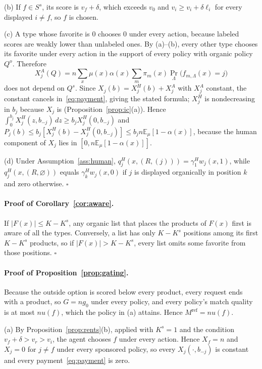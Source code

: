 \documentclass[opre,dblanonrev]{informs4}
\providecommand{\E}{\mathbb{E}}
\providecommand{\1}{\mathbf{1}}
\begin{document}
\begin{APPENDICES}
(b) If $f\in S^s$, its score is $v_f+\delta$, which exceeds $v_0$ and $v_i\ge v_i+\delta\ell_i$ for every displayed $i\ne f$, so $f$ is chosen.

(c) A type whose favorite is $0$ chooses $0$ under every action, because labeled scores are weakly lower than unlabeled ones. By (a)--(b), every other type chooses its favorite under every action in the support of every policy with organic policy $Q^o$. Therefore
\[
X_j^A(Q)=n\sum_x\mu(x)\alpha(x)\sum_m\pi_m(x)\Pr_\Lambda\bigl(f_{m,\Lambda}(x)=j\bigr)
\]
does not depend on $Q^s$. Since $X_j(b)=X_j^H(b)+X_j^A$ with $X_j^A$ constant, the constant cancels in~\eqref{eq:payment}, giving the stated formula; $X_j^H$ is nondecreasing in $b_j$ because $X_j$ is (Proposition~\ref{prop:ic}(a)). Hence $\int_0^{b_j}X_j^H(z,b_{-j})\,dz\ge b_jX_j^H(0,b_{-j})$ and $P_j(b)\le b_j[X_j^H(b)-X_j^H(0,b_{-j})]\le b_jn\E_\mu[1-\alpha(x)]$, because the human component of $X_j$ lies in $[0,n\E_\mu[1-\alpha(x)]]$.

(d) Under Assumption~\ref{ass:human}, $q_j^H(x,(R,(j)))=\gamma_1^Hw_j(x,1)$, while $q_j^H(x,(R,\varnothing))$ equals $\gamma_k^Hw_j(x,0)$ if $j$ is displayed organically in position $k$ and zero otherwise. \hfill$\square$

\paragraph{Proof of Corollary~\ref{cor:aware}.}
If $|F(x)|\le K-K^s$, any organic list that places the products of $F(x)$ first is aware of all the types. Conversely, a list has only $K-K^s$ positions among its first $K-K^s$ products, so if $|F(x)|>K-K^s$, every list omits some favorite from those positions. \hfill$\square$

\paragraph{Proof of Proposition~\ref{prop:gating}.}
Because the outside option is scored below every product, every request ends with a product, so $G=ng_0$ under every policy, and every policy's match quality is at most $nu(f)$, which the policy in (a) attains. Hence $M^{\mathrm{ref}}=nu(f)$.

(a) By Proposition~\ref{prop:rents}(b), applied with $K^s=1$ and the condition $v_f+\delta>v_r>v_i$, the agent chooses $f$ under every action. Hence $X_f=n$ and $X_j=0$ for $j\ne f$ under every sponsored policy, so every $X_j(\cdot,b_{-j})$ is constant and every payment~\eqref{eq:payment} is zero.


\end{APPENDICES}
\end{document}
